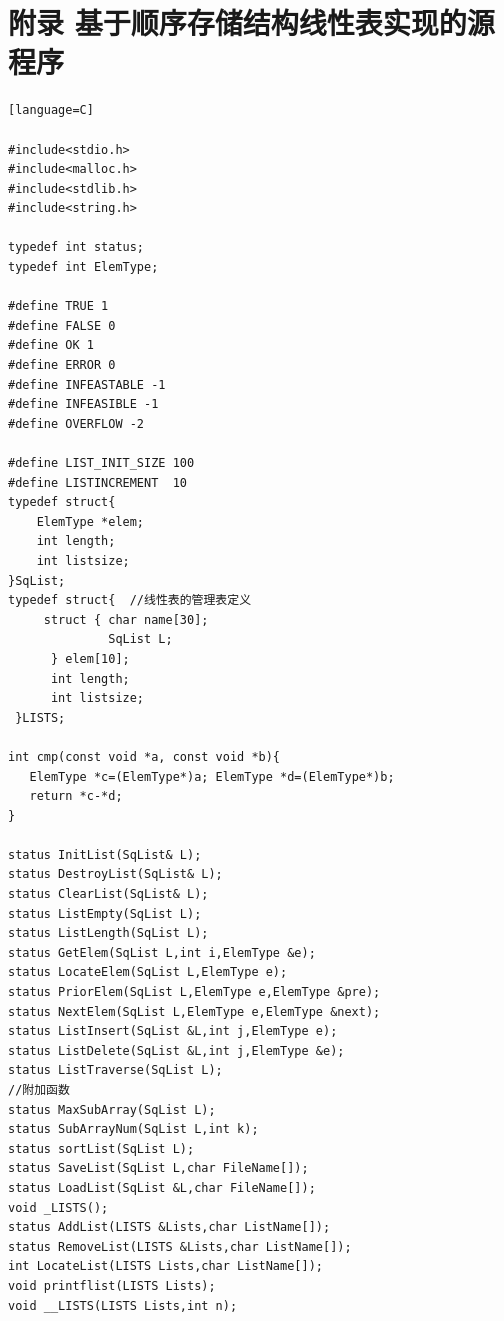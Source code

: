 \documentclass[supercite]{Experimental_Report}
\theoremstyle{definition}
\begin{document}
\begin{sloppypar}
\section{附录 基于顺序存储结构线性表实现的源程序}

\begin{lstlisting}[breaklines][language=C]

#include<stdio.h>
#include<malloc.h>
#include<stdlib.h>
#include<string.h>

typedef int status; 
typedef int ElemType; 

#define TRUE 1
#define FALSE 0
#define OK 1
#define ERROR 0
#define INFEASTABLE -1
#define INFEASIBLE -1
#define OVERFLOW -2

#define LIST_INIT_SIZE 100
#define LISTINCREMENT  10
typedef struct{  
	ElemType *elem;
	int length;
	int listsize;
}SqList;
typedef struct{  //线性表的管理表定义
     struct { char name[30];
     		  SqList L;	
      } elem[10];
      int length;
      int listsize;
 }LISTS;

int cmp(const void *a, const void *b){
   ElemType *c=(ElemType*)a; ElemType *d=(ElemType*)b; 
   return *c-*d;
}

status InitList(SqList& L);
status DestroyList(SqList& L);
status ClearList(SqList& L);
status ListEmpty(SqList L);
status ListLength(SqList L);
status GetElem(SqList L,int i,ElemType &e);
status LocateElem(SqList L,ElemType e); 
status PriorElem(SqList L,ElemType e,ElemType &pre);
status NextElem(SqList L,ElemType e,ElemType &next);
status ListInsert(SqList &L,int j,ElemType e);
status ListDelete(SqList &L,int j,ElemType &e);
status ListTraverse(SqList L);  
//附加函数 
status MaxSubArray(SqList L);
status SubArrayNum(SqList L,int k);
status sortList(SqList L);
status SaveList(SqList L,char FileName[]);
status LoadList(SqList &L,char FileName[]);
void _LISTS();
status AddList(LISTS &Lists,char ListName[]);
status RemoveList(LISTS &Lists,char ListName[]);
int LocateList(LISTS Lists,char ListName[]);
void printflist(LISTS Lists);
void __LISTS(LISTS Lists,int n);
 

\end{lstlisting}
\end{sloppypar}
\end{document}
